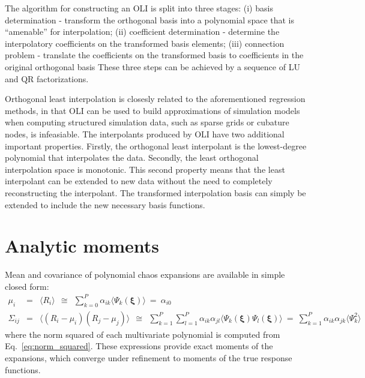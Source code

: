 The algorithm for constructing an OLI is split into three stages: 
(i) basis determination - transform the orthogonal basis into a polynomial space
that is “amenable” for interpolation;
(ii) coefficient determination - determine the interpolatory coefficients on the transformed basis elements;
(iii) connection problem - translate the coefficients on the transformed basis to coefficients in the original orthogonal basis
These three steps can be achieved by a sequence of LU and QR factorizations.

Orthogonal least interpolation is closesly related to the aforementioned regression methods, in that OLI can be used to build approximations of simulation models when computing structured simulation data, such as sparse grids or cubature nodes, is infeasiable. The interpolants produced by OLI have two additional important properties. Firstly, the orthogonal least interpolant is the lowest-degree polynomial that interpolates the data. Secondly, the least orthogonal interpolation space is monotonic. This second property means that the least interpolant can be extended to new data without the need to completely reconstructing the interpolant. The transformed interpolation basis can simply be extended to include the new necessary basis functions.


\section{Analytic moments} \label{uq:expansion:moment}

Mean and covariance of polynomial chaos expansions are available
in simple closed form:
\begin{eqnarray}
\mu_i      &=& \langle R_i \rangle ~~\cong~~ \sum_{k=0}^P \alpha_{ik} \langle 
\Psi_k(\boldsymbol{\xi}) \rangle ~=~ \alpha_{i0} \label{eq:mean_pce} \\
\Sigma_{ij} &=& \langle (R_i - \mu_i)(R_j - \mu_j) \rangle ~~\cong~~ 
\sum_{k=1}^P \sum_{l=1}^P \alpha_{ik} \alpha_{jl}
\langle \Psi_k(\boldsymbol{\xi}) \Psi_l(\boldsymbol{\xi}) \rangle ~=~
\sum_{k=1}^P \alpha_{ik}\alpha_{jk} \langle \Psi^2_k \rangle~~~~~~~~ \label{eq:covar_pce} 
\end{eqnarray}
where the norm squared of each multivariate polynomial is computed
from Eq.~\ref{eq:norm_squared}.  These expressions provide exact moments 
of the expansions, which converge under refinement to moments of the 
true response functions.

